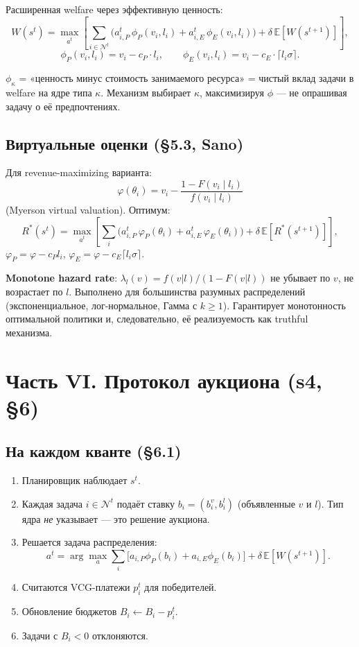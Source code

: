 \documentclass[11pt,a4paper]{article}
\begin{document}
Расширенная welfare через эффективную ценность:
\[
W(s^t)=\max_{a^t}\left[
\sum_{i\in\mathcal{N}^t}\!\bigl(a_{i,P}^t\,\phi_P(v_i,l_i)
+ a_{i,E}^t\,\phi_E(v_i,l_i)\bigr)
+ \delta\,\mathbb{E}[W(s^{t+1})]
\right],
\]
\[
\boxed{\phi_P(v_i,l_i) = v_i - c_P\cdot l_i,\qquad
\phi_E(v_i,l_i) = v_i - c_E\cdot\lceil l_i\sigma\rceil.}
\]

\begin{why}
$\phi_\kappa$ = «ценность минус стоимость занимаемого ресурса» =
чистый вклад задачи в welfare на ядре типа $\kappa$. Механизм
выбирает $\kappa$, максимизируя $\phi$ — не опрашивая задачу о её
предпочтениях.
\end{why}

\subsection{Виртуальные оценки (§5.3, Sano)}

Для revenue-maximizing варианта:
\[
\varphi(\theta_i) = v_i - \frac{1-F(v_i\mid l_i)}{f(v_i\mid l_i)}
\]
(Myerson virtual valuation). Оптимум:
\[
R^*(s^t) = \max_{a^t}\!\left[
\sum_i \bigl(a_{i,P}^t\,\varphi_P(\theta_i)
+ a_{i,E}^t\,\varphi_E(\theta_i)\bigr)
+ \delta\,\mathbb{E}[R^*(s^{t+1})]
\right],
\]
$\varphi_P = \varphi-c_P l_i$, $\varphi_E = \varphi-c_E\lceil l_i\sigma\rceil$.

\begin{why}
\textbf{Monotone hazard rate}: $\lambda_l(v)=f(v|l)/(1-F(v|l))$
не убывает по $v$, не возрастает по $l$. Выполнено для большинства
разумных распределений (экспоненциальное, лог-нормальное, Гамма с
$k\geq 1$). Гарантирует монотонность оптимальной политики и,
следовательно, её реализуемость как truthful механизма.
\end{why}

\section{Часть VI. Протокол аукциона (s4, §6)}

\subsection{На каждом кванте (§6.1)}

\begin{enumerate}[leftmargin=*]
  \item Планировщик наблюдает $s^t$.
  \item Каждая задача $i\in\mathcal{N}^t$ подаёт ставку
    $b_i=(b_i^v, b_i^l)$ (объявленные $v$ и $l$). Тип ядра
    \emph{не} указывает — это решение аукциона.
  \item Решается задача распределения:
    \[
    a^t = \arg\max_a \sum_i\bigl[a_{i,P}\phi_P(b_i)+a_{i,E}\phi_E(b_i)\bigr]
    + \delta\,\mathbb{E}[W(s^{t+1})].
    \]
  \item Считаются VCG-платежи $p_i^t$ для победителей.
  \item Обновление бюджетов $B_i \leftarrow B_i - p_i^t$.
  \item Задачи с $B_i<0$ отклоняются.
\end{enumerate}
\end{document}
